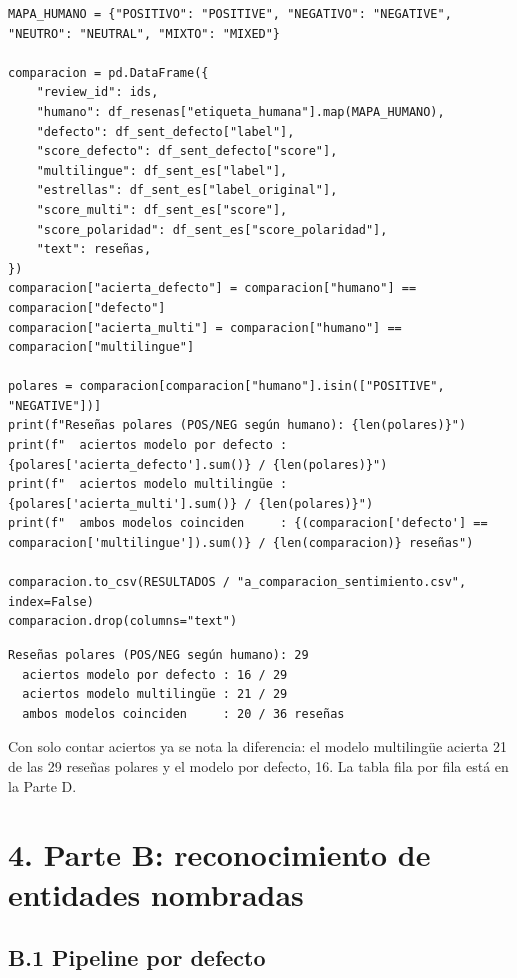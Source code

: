 \documentclass[12pt,a4paper]{article}
\begin{document}
\begin{lstlisting}[style=codigo]
MAPA_HUMANO = {"POSITIVO": "POSITIVE", "NEGATIVO": "NEGATIVE", "NEUTRO": "NEUTRAL", "MIXTO": "MIXED"}

comparacion = pd.DataFrame({
    "review_id": ids,
    "humano": df_resenas["etiqueta_humana"].map(MAPA_HUMANO),
    "defecto": df_sent_defecto["label"],
    "score_defecto": df_sent_defecto["score"],
    "multilingue": df_sent_es["label"],
    "estrellas": df_sent_es["label_original"],
    "score_multi": df_sent_es["score"],
    "score_polaridad": df_sent_es["score_polaridad"],
    "text": reseñas,
})
comparacion["acierta_defecto"] = comparacion["humano"] == comparacion["defecto"]
comparacion["acierta_multi"] = comparacion["humano"] == comparacion["multilingue"]

polares = comparacion[comparacion["humano"].isin(["POSITIVE", "NEGATIVE"])]
print(f"Reseñas polares (POS/NEG según humano): {len(polares)}")
print(f"  aciertos modelo por defecto : {polares['acierta_defecto'].sum()} / {len(polares)}")
print(f"  aciertos modelo multilingüe : {polares['acierta_multi'].sum()} / {len(polares)}")
print(f"  ambos modelos coinciden     : {(comparacion['defecto'] == comparacion['multilingue']).sum()} / {len(comparacion)} reseñas")

comparacion.to_csv(RESULTADOS / "a_comparacion_sentimiento.csv", index=False)
comparacion.drop(columns="text")
\end{lstlisting}

\begin{lstlisting}[style=salida]
Reseñas polares (POS/NEG según humano): 29
  aciertos modelo por defecto : 16 / 29
  aciertos modelo multilingüe : 21 / 29
  ambos modelos coinciden     : 20 / 36 reseñas
\end{lstlisting}


Con solo contar aciertos ya se nota la diferencia: el modelo multilingüe acierta 21 de las 29
reseñas polares y el modelo por defecto, 16. La tabla fila por fila está en la Parte D.


\section{4. Parte B: reconocimiento de entidades nombradas}

\subsection{B.1 Pipeline por defecto}
\end{document}
